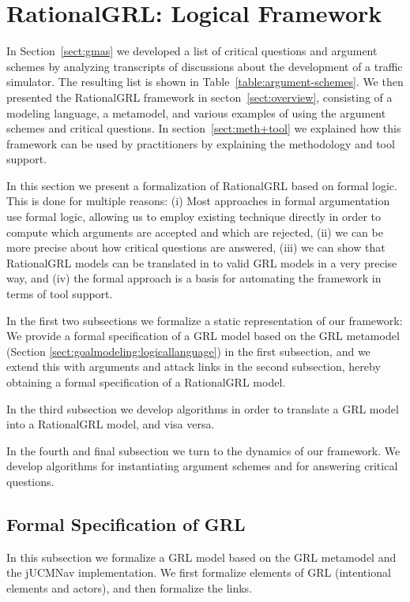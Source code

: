 \section{RationalGRL: Logical Framework}
\label{sect:formalframework}

In Section~\ref{sect:gmas} we developed a list of critical questions and argument schemes by analyzing transcripts of discussions about the development of a traffic simulator. The resulting list is shown in Table~\ref{table:argument-schemes}. We then presented the RationalGRL framework in secton~\ref{sect:overview}, consisting of a modeling language, a metamodel, and various examples of using the argument schemes and critical questions. In section~\ref{sect:meth+tool} we explained how this framework can be used by practitioners by explaining the methodology and tool support.

In this section we present a formalization of RationalGRL based on formal logic. This is done for multiple reasons: (i) Most approaches in formal argumentation use formal logic, allowing us to employ existing technique directly in order to compute which arguments are accepted and which are rejected, (ii) we can be more precise about how critical questions are answered, (iii) we can show that RationalGRL models can be translated in to valid GRL models in a very precise way, and (iv) the formal approach is a basis for automating the framework in terms of tool support.

In the first two subsections we formalize a static representation of our framework: We provide a formal specification of a GRL model based on the GRL metamodel (Section \ref{sect:goalmodeling:logicallanguage}) in the first subsection, and we extend this with arguments and attack links in the second subsection, hereby obtaining a formal specification of a RationalGRL model. 

In the third subsection we develop algorithms in order to translate a GRL model into a RationalGRL model, and visa versa.

In the fourth and final subsection we turn to the dynamics of our framework. We develop algorithms for instantiating argument schemes and for answering critical questions. 

\subsection{Formal Specification of GRL}
\label{sect:formalframework:grl}

In this subsection we formalize a GRL model based on the GRL metamodel and the jUCMNav implementation. We first formalize elements of GRL (intentional elements and actors), and then formalize the links.

